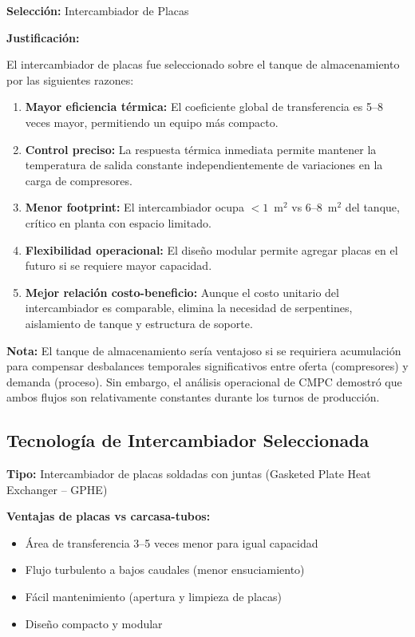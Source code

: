 \documentclass[12pt,a4paper]{article}
\begin{document}
\textbf{Selección:} Intercambiador de Placas

\textbf{Justificación:}

El intercambiador de placas fue seleccionado sobre el tanque de almacenamiento por las siguientes razones:

\begin{enumerate}
    \item \textbf{Mayor eficiencia térmica:} El coeficiente global de transferencia es 5--8 veces mayor, permitiendo un equipo más compacto.
    
    \item \textbf{Control preciso:} La respuesta térmica inmediata permite mantener la temperatura de salida constante independientemente de variaciones en la carga de compresores.
    
    \item \textbf{Menor footprint:} El intercambiador ocupa $< 1$~m$^2$ vs 6--8~m$^2$ del tanque, crítico en planta con espacio limitado.
    
    \item \textbf{Flexibilidad operacional:} El diseño modular permite agregar placas en el futuro si se requiere mayor capacidad.
    
    \item \textbf{Mejor relación costo-beneficio:} Aunque el costo unitario del intercambiador es comparable, elimina la necesidad de serpentines, aislamiento de tanque y estructura de soporte.
\end{enumerate}

\textbf{Nota:} El tanque de almacenamiento sería ventajoso si se requiriera acumulación para compensar desbalances temporales significativos entre oferta (compresores) y demanda (proceso). Sin embargo, el análisis operacional de CMPC demostró que ambos flujos son relativamente constantes durante los turnos de producción.

\subsection{Tecnología de Intercambiador Seleccionada}

\textbf{Tipo:} Intercambiador de placas soldadas con juntas (Gasketed Plate Heat Exchanger -- GPHE)

\textbf{Ventajas de placas vs carcasa-tubos:}
\begin{itemize}
    \item Área de transferencia 3--5 veces menor para igual capacidad
    \item Flujo turbulento a bajos caudales (menor ensuciamiento)
    \item Fácil mantenimiento (apertura y limpieza de placas)
    \item Diseño compacto y modular
\end{itemize}
\end{document}
